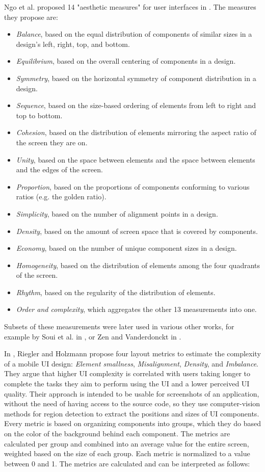 \documentclass[11pt,titlepage,oneside,openany]{book}
\begin{document}
Ngo et al. proposed 14 "aesthetic measures" for user interfaces in \cite{ngo_formalising_2000}. The measures they propose are: 
\begin{itemize}
	\item \emph{Balance}, based on the equal distribution of components of similar sizes in a design's left, right, top, and bottom.
	\item \emph{Equilibrium},  based on the overall centering of components in a design.
	\item \emph{Symmetry}, based on the horizontal symmetry of component distribution in a design.
	\item \emph{Sequence}, based on the size-based ordering of elements from left to right and top to bottom.
	\item \emph{Cohesion}, based on the distribution of elements mirroring the aspect ratio of the screen they are on.
	\item \emph{Unity}, based on the space between elements and the space between elements and the edges of the screen.
	\item \emph{Proportion}, based on the proportions of components conforming to various ratios (e.g. the golden ratio).
	\item \emph{Simplicity}, based on the number of alignment points in a design.
	\item \emph{Density}, based on the amount of screen space that is covered by components.
	\item \emph{Economy}, based on the number of unique component sizes in a design.
	\item \emph{Homogeneity}, based on the distribution of elements among the four quadrants of the screen.
	\item \emph{Rhythm}, based on the regularity of the distribution of elements.
	\item \emph{Order and complexity}, which aggregates the other 13 measurements into one.
\end{itemize}

Subsets of these measurements were later used in various other works, for example by Soui et al. in \cite{soui_plain_2017}, or Zen and Vanderdonckt in \cite{zen_towards_2014}.

In \cite{riegler_measuring_2018}, Riegler and Holzmann propose four layout metrics to estimate the complexity of a mobile UI design: \emph{Element smallness}, \emph{Misalignment}, \emph{Density}, and \emph{Imbalance}. They argue that higher UI complexity is correlated with users taking longer to complete the tasks they aim to perform using the UI and a lower perceived UI quality. Their approach is intended to be usable for screenshots of an application, without the need of having access to the source code, so they use computer-vision methods for region detection to extract the positions and sizes of UI components. Every metric is based on organizing components into groups, which they do based on the color of the background behind each component. The metrics are calculated per group and combined into an average value for the entire screen, weighted based on the size of each group. Each metric is normalized to a value between 0 and 1. The metrics are calculated and can be interpreted as follows: 
\end{document}
